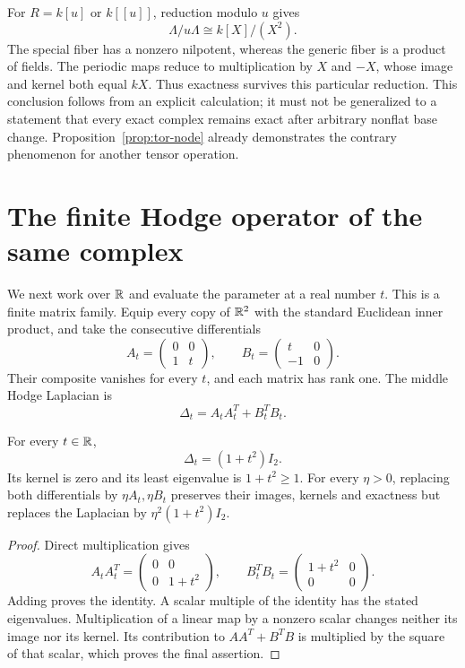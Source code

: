 For $R=k[u]$ or $k[[u]]$, reduction modulo $u$ gives
\[
 \Lambda/u\Lambda\cong k[X]/(X^2).
\]
The special fiber has a nonzero nilpotent, whereas the generic fiber is a
product of fields. The periodic maps reduce to multiplication by $X$ and
$-X$, whose image and kernel both equal $kX$. Thus exactness survives this
particular reduction. This conclusion follows from an explicit calculation;
it must not be generalized to a statement that every exact complex remains
exact after arbitrary nonflat base change. Proposition~\ref{prop:tor-node}
already demonstrates the contrary phenomenon for another tensor operation.

\section{The finite Hodge operator of the same complex}

We next work over $\mathbb{R}$ and evaluate the parameter at a real number $t$.
This is a finite matrix family. Equip every copy of $\mathbb{R}^2$ with the standard
Euclidean inner product, and take the consecutive differentials
\[
 A_t=\begin{pmatrix}0&0\\1&t\end{pmatrix},\qquad
 B_t=\begin{pmatrix}t&0\\-1&0\end{pmatrix}.
\]
Their composite vanishes for every $t$, and each matrix has rank one.
The middle Hodge Laplacian is
\[
 \Delta_t=A_tA_t^T+B_t^TB_t.
\]

\begin{proposition}
For every $t\in\mathbb{R}$,
\[
 \Delta_t=(1+t^2)I_2.
\]
Its kernel is zero and its least eigenvalue is $1+t^2\geq1$.
For every $\eta>0$, replacing both differentials by
$\eta A_t,\eta B_t$ preserves their images, kernels and exactness but
replaces the Laplacian by $\eta^2(1+t^2)I_2$.
\end{proposition}
\begin{proof}
Direct multiplication gives
\[
 A_tA_t^T=\begin{pmatrix}0&0\\0&1+t^2\end{pmatrix},\qquad
 B_t^TB_t=\begin{pmatrix}1+t^2&0\\0&0\end{pmatrix}.
\]
Adding proves the identity. A scalar multiple of the identity has the stated
eigenvalues. Multiplication of a linear map by a nonzero scalar changes
neither its image nor its kernel. Its contribution to $AA^T+B^TB$ is
multiplied by the square of that scalar, which proves the final assertion.
\end{proof}

